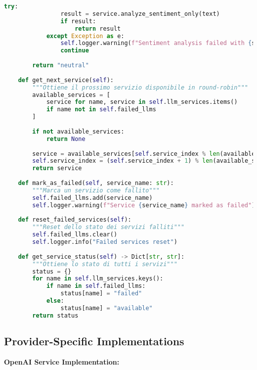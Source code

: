\documentclass[12pt,a4paper]{report}
\begin{document}
\begin{lstlisting}[language=Python, caption=LLM Manager Implementation]
            try:
                result = service.analyze_sentiment_only(text)
                if result:
                    return result
            except Exception as e:
                self.logger.warning(f"Sentiment analysis failed with {service_name}: {e}")
                continue
        
        return "neutral"
    
    def get_next_service(self):
        """Ottiene il prossimo servizio disponibile in round-robin"""
        available_services = [
            service for name, service in self.llm_services.items()
            if name not in self.failed_llms
        ]
        
        if not available_services:
            return None
        
        service = available_services[self.service_index % len(available_services)]
        self.service_index = (self.service_index + 1) % len(available_services)
        return service
    
    def mark_as_failed(self, service_name: str):
        """Marca un servizio come fallito"""
        self.failed_llms.add(service_name)
        self.logger.warning(f"Service {service_name} marked as failed")
    
    def reset_failed_services(self):
        """Reset dello stato dei servizi falliti"""
        self.failed_llms.clear()
        self.logger.info("Failed services reset")
    
    def get_service_status(self) -> Dict[str, str]:
        """Ottiene lo stato di tutti i servizi"""
        status = {}
        for name in self.llm_services.keys():
            if name in self.failed_llms:
                status[name] = "failed"
            else:
                status[name] = "available"
        return status
\end{lstlisting}

\subsection{Provider-Specific Implementations}

\textbf{OpenAI Service Implementation:}
\end{document}
